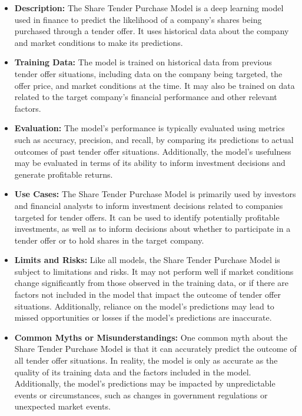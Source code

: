 \begin{itemize}
    \item \textbf{Description:} The Share Tender Purchase Model is a deep learning model used in finance to predict the likelihood of a company's shares being purchased through a tender offer. It uses historical data about the company and market conditions to make its predictions.
    \item \textbf{Training Data:} The model is trained on historical data from previous tender offer situations, including data on the company being targeted, the offer price, and market conditions at the time. It may also be trained on data related to the target company's financial performance and other relevant factors.
    \item \textbf{Evaluation:} The model's performance is typically evaluated using metrics such as accuracy, precision, and recall, by comparing its predictions to actual outcomes of past tender offer situations. Additionally, the model's usefulness may be evaluated in terms of its ability to inform investment decisions and generate profitable returns.
    \item \textbf{Use Cases:} The Share Tender Purchase Model is primarily used by investors and financial analysts to inform investment decisions related to companies targeted for tender offers. It can be used to identify potentially profitable investments, as well as to inform decisions about whether to participate in a tender offer or to hold shares in the target company.
    \item \textbf{Limits and Risks:} Like all models, the Share Tender Purchase Model is subject to limitations and risks. It may not perform well if market conditions change significantly from those observed in the training data, or if there are factors not included in the model that impact the outcome of tender offer situations. Additionally, reliance on the model's predictions may lead to missed opportunities or losses if the model's predictions are inaccurate.
    \item \textbf{Common Myths or Misunderstandings:} One common myth about the Share Tender Purchase Model is that it can accurately predict the outcome of all tender offer situations. In reality, the model is only as accurate as the quality of its training data and the factors included in the model. Additionally, the model's predictions may be impacted by unpredictable events or circumstances, such as changes in government regulations or unexpected market events.
\end{itemize}

